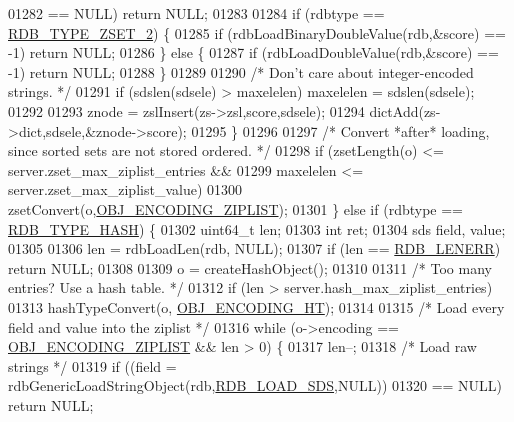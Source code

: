 \begin{DoxyCode}
{{{{{{{{{{{{{{{{{{{{{{{01282                 == NULL) \textcolor{keywordflow}{return} NULL;
01283 
01284             \textcolor{keywordflow}{if} (rdbtype == \hyperlink{rdb_8h_adc645c9007ce7ce91f18bc88a7ea6918}{RDB\_TYPE\_ZSET\_2}) \{
01285                 \textcolor{keywordflow}{if} (rdbLoadBinaryDoubleValue(rdb,&score) == -1) \textcolor{keywordflow}{return} NULL;
01286             \} \textcolor{keywordflow}{else} \{
01287                 \textcolor{keywordflow}{if} (rdbLoadDoubleValue(rdb,&score) == -1) \textcolor{keywordflow}{return} NULL;
01288             \}
01289 
01290             \textcolor{comment}{/* Don't care about integer-encoded strings. */}
01291             \textcolor{keywordflow}{if} (sdslen(sdsele) > maxelelen) maxelelen = sdslen(sdsele);
01292 
01293             znode = zslInsert(zs->zsl,score,sdsele);
01294             dictAdd(zs->dict,sdsele,&znode->score);
01295         \}
01296 
01297         \textcolor{comment}{/* Convert *after* loading, since sorted sets are not stored ordered. */}
01298         \textcolor{keywordflow}{if} (zsetLength(o) <= server.zset\_max\_ziplist\_entries &&
01299             maxelelen <= server.zset\_max\_ziplist\_value)
01300                 zsetConvert(o,\hyperlink{server_8h_aabf064ede983103f1fd0df2086e84eee}{OBJ\_ENCODING\_ZIPLIST});
01301     \} \textcolor{keywordflow}{else} \textcolor{keywordflow}{if} (rdbtype == \hyperlink{rdb_8h_a61a89168792f4d82b4e5b0e3b02a68ca}{RDB\_TYPE\_HASH}) \{
01302         uint64\_t len;
01303         \textcolor{keywordtype}{int} ret;
01304         sds field, value;
01305 
01306         len = rdbLoadLen(rdb, NULL);
01307         \textcolor{keywordflow}{if} (len == \hyperlink{rdb_8h_aa66b6ad7261656029e6a67cf78432b2d}{RDB\_LENERR}) \textcolor{keywordflow}{return} NULL;
01308 
01309         o = createHashObject();
01310 
01311         \textcolor{comment}{/* Too many entries? Use a hash table. */}
01312         \textcolor{keywordflow}{if} (len > server.hash\_max\_ziplist\_entries)
01313             hashTypeConvert(o, \hyperlink{server_8h_a9c10219f68afc557d510d108257d238b}{OBJ\_ENCODING\_HT});
01314 
01315         \textcolor{comment}{/* Load every field and value into the ziplist */}
01316         \textcolor{keywordflow}{while} (o->encoding == \hyperlink{server_8h_aabf064ede983103f1fd0df2086e84eee}{OBJ\_ENCODING\_ZIPLIST} && len > 0) \{
01317             len--;
01318             \textcolor{comment}{/* Load raw strings */}
01319             \textcolor{keywordflow}{if} ((field = rdbGenericLoadStringObject(rdb,\hyperlink{rdb_8h_ad15f5cc8e1a7789cc35b66f017e98a18}{RDB\_LOAD\_SDS},NULL))
01320                 == NULL) \textcolor{keywordflow}{return} NULL;
}}}}}}}}}}}}}}}}}}}}}}}
\end{DoxyCode}

